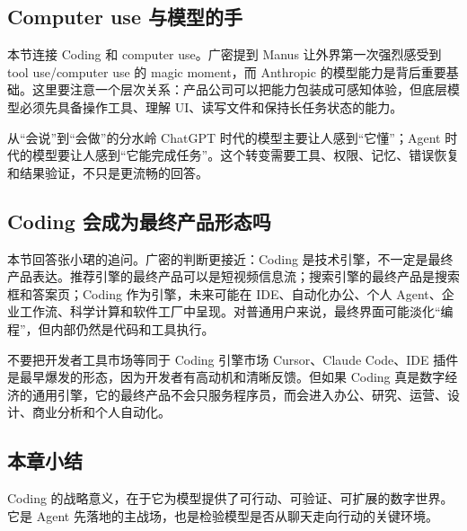 \subsection{Computer use 与模型的手}

本节连接 Coding 和 computer use。广密提到 Manus 让外界第一次强烈感受到 tool use/computer use 的 magic moment，而 Anthropic 的模型能力是背后重要基础。这里要注意一个层次关系：产品公司可以把能力包装成可感知体验，但底层模型必须先具备操作工具、理解 UI、读写文件和保持长任务状态的能力。

\begin{importantbox}{从“会说”到“会做”的分水岭}
ChatGPT 时代的模型主要让人感到“它懂”；Agent 时代的模型要让人感到“它能完成任务”。这个转变需要工具、权限、记忆、错误恢复和结果验证，不只是更流畅的回答。
\end{importantbox}

\subsection{Coding 会成为最终产品形态吗}

本节回答张小珺的追问。广密的判断更接近：Coding 是技术引擎，不一定是最终产品表达。推荐引擎的最终产品可以是短视频信息流；搜索引擎的最终产品是搜索框和答案页；Coding 作为引擎，未来可能在 IDE、自动化办公、个人 Agent、企业工作流、科学计算和软件工厂中呈现。对普通用户来说，最终界面可能淡化“编程”，但内部仍然是代码和工具执行。

\begin{warningbox}{不要把开发者工具市场等同于 Coding 引擎市场}
Cursor、Claude Code、IDE 插件是最早爆发的形态，因为开发者有高动机和清晰反馈。但如果 Coding 真是数字经济的通用引擎，它的最终产品不会只服务程序员，而会进入办公、研究、运营、设计、商业分析和个人自动化。
\end{warningbox}

\subsection{本章小结}

Coding 的战略意义，在于它为模型提供了可行动、可验证、可扩展的数字世界。它是 Agent 先落地的主战场，也是检验模型是否从聊天走向行动的关键环境。

